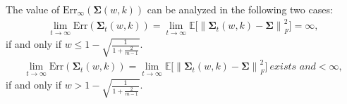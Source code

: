 \begin{lemma}
\label{Lemma_temp_for_Thm4}
The value of $\mathrm{Err}_{\infty}(\bm{\Sigma}(w,k))$ can be analyzed in the following two cases:
\label{multi_critical_point_lemma}
\begin{align}
\lim_{t\to \infty}\mathrm{Err}(\bm{\Sigma}_{t}(w,k)) = \lim_{t \to \infty}\mathbb{E}\big[\left\|\bm{\Sigma}_{t}(w,k) - \bm{\Sigma}\right \|^2_F\big]=\infty,
\end{align}
if and only if $w\leq 1-\sqrt{\frac{1}{1+\frac{2}{m-1}}}$.
\begin{align}
\lim_{t\to \infty}\mathrm{Err}(\bm{\Sigma}_{t}(w,k)) = \lim_{t \to \infty}\mathbb{E}\big[\left\|\bm{\Sigma}_{t}(w,k) - \bm{\Sigma}\right\|_F^2\big] \ \textit{exists and}<\infty,
\end{align}
if and only if $w>1-\sqrt{\frac{1}{1+\frac{2}{m-1}}}$.
\end{lemma}

